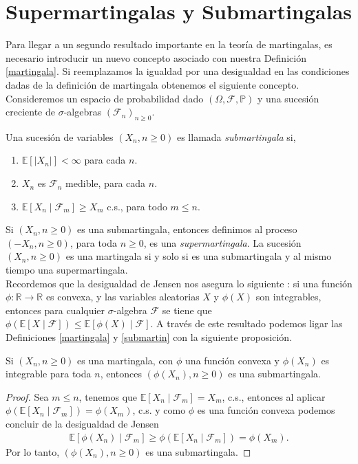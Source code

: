 \section{Supermartingalas y Submartingalas}
Para llegar a un segundo resultado importante en la teoría de martingalas, es necesario introducir un nuevo concepto asociado con nuestra Definición \ref{martingala}. Si reemplazamos la igualdad por una desigualdad en las condiciones dadas de la definición de martingala obtenemos el siguiente concepto. \\

Consideremos un espacio de probabilidad dado $(\Omega, \mathcal{F}, \mathbb{P})$ y una sucesión creciente de $\sigma$-algebras $(\mathcal{F}_n)_{n \geq 0}$.

\begin{definition}
\label{submartin}
	Una sucesión de variables $(X_n, n \geq 0)$ es llamada \emph{submartingala} si,
	\begin{enumerate}
		\item $\mathbb{E}[|X_n|] < \infty$ para cada $n$.
		\item $X_n$ es $\mathcal{F}_n$ medible, para cada $n$.
		\item $\mathbb{E}[X_n \mid \mathcal{F}_m] \geq X_m$ c.s., para todo $m \leq n$.
	\end{enumerate}
\end{definition}

Si $(X_n, n \geq 0)$ es una submartingala, entonces definimos al proceso $(- X_n, n \geq 0)$, para toda $n \geq 0$, es una \emph{supermartingala}. La sucesión $(X_n, n \geq 0)$ es una martingala si y solo si es una submartingala y al mismo tiempo una supermartingala. \\

Recordemos que la desigualdad de Jensen nos asegura lo siguiente \cite[p.~205]{jacodprotter}: si una función $\phi: \mathbb{R} \rightarrow \mathbb{R}$ es convexa, y las variables aleatorias $X$ y $\phi(X)$ son integrables, entonces para cualquier $\sigma$-algebra $\mathcal{F}$ se tiene que $\phi(\mathbb{E}[X \mid \mathcal{F}]) \leq \mathbb{E}[\phi(X) \mid \mathcal{F}]$. A través de este resultado podemos ligar las Definiciones \ref{martingala} y \ref{submartin} con la siguiente proposición.

\begin{proposition}
\label{convexa}
	Si $(X_n, n \geq 0)$ es una martingala, con $\phi$ una función convexa y $\phi(X_n)$ es integrable para toda $n$, entonces $(\phi(X_n), n \geq 0)$ es una submartingala.
\end{proposition}
\begin{proof}
	Sea $m \leq n$, tenemos que $\mathbb{E}[X_n \mid \mathcal{F}_m] = X_m$, c.s., entonces al aplicar $\phi(\mathbb{E}[X_n \mid \mathcal{F}_m]) = \phi(X_m)$, c.s. y como $\phi$ es una función convexa podemos concluir de la desigualdad de Jensen
	\begin{align*}
		\mathbb{E}[\phi(X_n) \mid \mathcal{F}_m] \geq \phi(\mathbb{E}[X_n \mid \mathcal{F}_m]) = \phi(X_m).
	\end{align*}
	Por lo tanto, $(\phi(X_n), n \geq 0)$ es una submartingala.
\end{proof}

